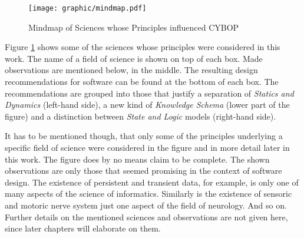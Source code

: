\begin{figure}[ht]
    \begin{center}
        \texttt{[image: graphic/mindmap.pdf]}
        \caption{Mindmap of Sciences whose Principles influenced CYBOP}
        \label{mindmap_figure}
    \end{center}
\end{figure}

Figure \ref{mindmap_figure} shows some of the sciences whose principles were
considered in this work. The name of a field of science is shown on top of each
box. Made observations are mentioned below, in the middle. The resulting design
recommendations for software can be found at the bottom of each box. The
recommendations are grouped into those that justify a separation of
\emph{Statics and Dynamics} (left-hand side), a new kind of
\emph{Knowledge Schema} (lower part of the figure) and a distinction between
\emph{State and Logic} models (right-hand side).

It has to be mentioned though, that only some of the principles underlying a
specific field of science were considered in the figure and in more detail
later in this work. The figure does by no means claim to be complete. The shown
observations are only those that seemed promising in the context of software
design. The existence of persistent and transient data, for example, is only
one of many aspects of the science of informatics. Similarly is the existence
of sensoric and motoric nerve system just one aspect of the field of neurology.
And so on. Further details on the mentioned sciences and observations are not
given here, since later chapters will elaborate on them.
